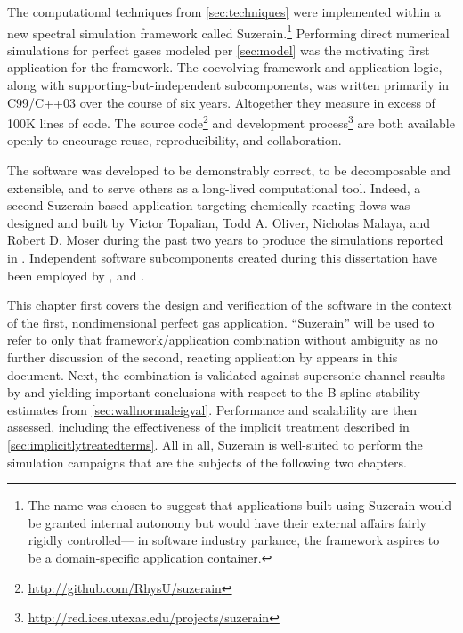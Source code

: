 \label{sec:software}

The computational techniques from \autoref{sec:techniques} were
implemented within a new spectral simulation framework called
Suzerain.\footnote{%
    The name was chosen to suggest that applications built using Suzerain
    would be granted internal autonomy but would have their external
    affairs fairly rigidly controlled--- in software industry parlance,
    the framework aspires to be a domain-specific application container.
}
Performing direct numerical simulations for perfect gases modeled per \autoref{sec:model}
was the motivating first application for the framework.  The coevolving
framework and application logic, along with supporting-but-independent
subcomponents, was written primarily in C99/C++03 over the course of six
years.  Altogether they measure in excess of 100K lines of code.  The source
code\footnote{\url{http://github.com/RhysU/suzerain}} and
development
process\footnote{\url{http://red.ices.utexas.edu/projects/suzerain}} are both
available openly to encourage reuse, reproducibility, and collaboration.

The software was developed to be demonstrably correct, to be decomposable and
extensible, and to serve others as a long-lived computational tool.  Indeed, a
second Suzerain-based application targeting chemically reacting
flows was designed and built by Victor Topalian, Todd A. Oliver, Nicholas
Malaya, and Robert D. Moser during the past two years to produce the simulations
reported in \citet{Topalian2013Direct, Topalian2014Temporal,
Topalian2014Spatiotemporal}.  Independent software subcomponents created during
this dissertation have been employed by \citet{Malaya2012Estimating,
Lee2014Experiences, Lee2013Petascale, Lee2014Direct},
and \citet{Oliver2014Estimating}.

This chapter first covers the design and verification of the software in the
context of the first, nondimensional perfect gas application.  ``Suzerain'' will
be used to refer to only that framework/application combination without
ambiguity as no further discussion of the second, reacting application by
\citeauthor{Topalian2013Direct} appears in this document.  Next, the combination
is validated against supersonic channel results by \citet{Coleman1995Numerical}
and \citet{Huang1995Compressible} yielding important conclusions with respect to
the B-spline stability estimates from \autoref{sec:wallnormaleigval}.
Performance and scalability are then assessed, including the effectiveness of
the implicit treatment described in \autoref{sec:implicitlytreatedterms}.  All
in all, Suzerain is well-suited to perform the simulation campaigns
that are the subjects of the following two chapters.


